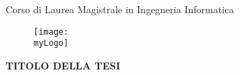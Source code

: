 %
%
\cleardoublepage
%
%
\thispagestyle{empty}
%
%
%

\begin {center}
{
	\fontsize{1cm}{1.2em}\textbf{\textsc{\myUni}}\\[1cm]
}
\end{center}
\begin{center} 
{
	\fontsize{0.6cm}{1em}\textnormal{\myFaculty}\\[0.2cm]
	\fontsize{0.6cm}{1em}\textnormal{Corso di Laurea Magistrale in Ingegneria Informatica}
}
\end{center}

\begin{figure}[h]
	\centering
 	\texttt{[image: \\myLogo]}
\end{figure} 
 
\begin {center}
{
	\fontsize{1.4cm}{1em}\textbf{TITOLO DELLA TESI} \\[3cm]
}
\end{center}

